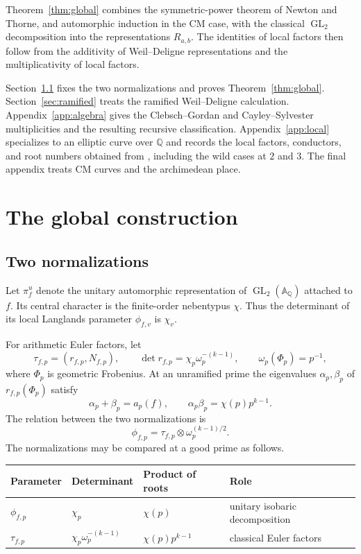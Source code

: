 \documentclass[11pt,reqno]{amsart}
\theoremstyle{definition}
\theoremstyle{remark}
\newcommand{\A}{\mathbb A}
\newcommand{\Q}{\mathbb Q}
\newcommand{\GL}{\operatorname{GL}}
\begin{document}
Theorem~\ref{thm:global} combines the symmetric-power theorem of Newton and
Thorne, and automorphic induction in the CM case, with the classical $\GL_2$ decomposition into the representations $R_{a,b}$.
The identities of local factors then follow from the additivity of Weil--Deligne
representations and the multiplicativity of local factors.

Section~\ref{sec:normalizations} fixes the two normalizations and proves Theorem~\ref{thm:global}.  Section~\ref{sec:ramified} treats the ramified Weil--Deligne calculation.  Appendix~\ref{app:algebra} gives the
Clebsch--Gordan and Cayley--Sylvester multiplicities and the resulting recursive classification.
Appendix~\ref{app:local} specializes to an
elliptic curve over $\Q$ and records the local factors, conductors, and root numbers obtained from \cite{DMW,MartinWatkins}, including the wild cases at $2$ and $3$.
The final appendix treats CM curves and the archimedean place.

\section{The global construction}

\subsection{Two normalizations}\label{sec:normalizations}

Let $\pi_f^u$ denote the unitary automorphic representation of $\GL_2(\A_\Q)$ attached to $f$.
Its central character is the finite-order nebentypus $\chi$.
Thus the determinant of its local Langlands parameter $\phi_{f,v}$ is $\chi_v$.

For arithmetic Euler factors, let
\begin{equation}\label{eq:motivic-WD}
 \tau_{f,p}=(r_{f,p},N_{f,p}),\qquad
 \det r_{f,p}=\chi_p\omega_p^{-(k-1)},\qquad
 \omega_p(\Phi_p)=p^{-1},
\end{equation}
where $\Phi_p$ is geometric Frobenius.
At an unramified prime the eigenvalues $\alpha_p,\beta_p$ of $r_{f,p}(\Phi_p)$ satisfy
\begin{equation*}
 \alpha_p+\beta_p=a_p(f),\qquad
 \alpha_p\beta_p=\chi(p)p^{k-1}.
\end{equation*}
The relation between the two normalizations is
\begin{equation}\label{eq:normalization-relation}
 \phi_{f,p}=\tau_{f,p}\otimes\omega_p^{(k-1)/2}.
\end{equation}
The normalizations may be compared at a good prime as follows.
\begin{center}
\renewcommand{\arraystretch}{1.15}
\begin{tabular}{@{}llll@{}}
\toprule
Parameter & Determinant & Product of roots & Role \\
\midrule
$\phi_{f,p}$ & $\chi_p$ & $\chi(p)$ & unitary isobaric decomposition \\
$\tau_{f,p}$ & $\chi_p\omega_p^{-(k-1)}$
& $\chi(p)p^{k-1}$ & classical Euler factors \\
\bottomrule
\end{tabular}
\end{center}
\end{document}

